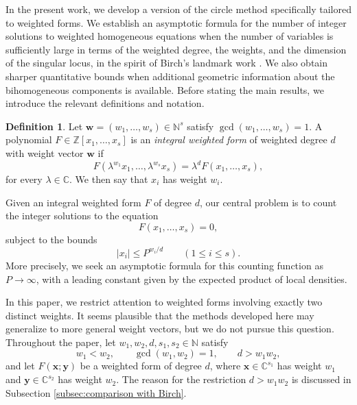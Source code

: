 \documentclass[12pt,reqno]{amsart}
\theoremstyle{definition}
\newtheorem{definition}[theorem]{Definition}
\theoremstyle{remark}
\numberwithin{equation}{section}
\def\bfw{{\mathbf w}}
\def\bfx{{\mathbf x}}
\def\bfy{{\mathbf y}}
\def\C{{\mathbb C}}\def\D{{\mathbb D}}
\def\N{{\mathbb N}} \def\O{{\mathbb O}} \def\P{{\mathbb P}}
\def\Z{{\mathbb Z}}\def\Q{{\mathbb Q}}
\begin{document}
In the present work, we develop a version of the circle method specifically
tailored to weighted forms.  We establish an asymptotic formula for the
number of integer solutions to weighted homogeneous equations when the
number of variables is sufficiently large in terms of the weighted degree,
the weights, and the dimension of the singular locus, in the spirit of
Birch's landmark work \cite{Birch1962}.  We also obtain sharper quantitative
bounds when additional geometric information about the bihomogeneous
components is available.  Before stating the main results, we introduce the
relevant definitions and notation.


\begin{definition}\label{def:weightedform}
Let $\bfw=(w_1,\ldots,w_s)\in\N^s$ satisfy
$\gcd(w_1,\ldots,w_s)=1$.  A polynomial
$F\in\Z[x_1,\ldots,x_s]$ is an \emph{integral weighted form} of weighted
degree $d$ with weight vector $\bfw$ if
\[
F(\lambda^{w_1}x_1,\ldots,\lambda^{w_s}x_s)
    =\lambda^dF(x_1,\ldots,x_s),
\]
for every $\lambda\in\C$.  We then say that $x_i$ has weight $w_i$.
\end{definition}

Given an integral weighted form $F$ of degree $d$, our central problem is to
count the integer solutions to the equation
\[
    F(x_1,\ldots,x_s)=0,
\]
subject to the bounds
\[
    |x_i|\leq P^{w_i/d}\qquad(1\leq i\leq s).
\]
More precisely, we seek an asymptotic formula for this counting function as
$P\to\infty$, with a leading constant given by the expected product of
local densities.

In this paper, we restrict attention to weighted forms involving exactly two
distinct weights.  It seems plausible that the methods developed here may
generalize to more general weight vectors, but we do not pursue this
question.  Throughout the paper, let
$w_1,w_2,d,s_1,s_2\in\N$ satisfy
\[
    w_1<w_2,\qquad \gcd(w_1,w_2)=1,
    \qquad d>w_1w_2,
\]
and let $F(\bfx;\bfy)$ be a weighted form of degree $d$, where
$\bfx\in\C^{s_1}$ has weight $w_1$ and $\bfy\in\C^{s_2}$ has weight
$w_2$. The reason for the restriction $d>w_1w_2$ is discussed in
Subsection \ref{subsec:comparison with Birch}.
\end{document}
